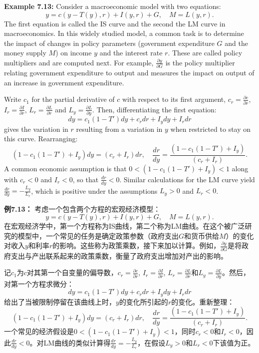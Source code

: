 \begin{original}
\textbf{Example 7.13:} Consider a macroeconomic model with two equations:
\[
y = c(y - T(y), r) + I(y, r) + G, \quad M = L(y, r).
\]
The first equation is called the IS curve and the second the LM curve in macroeconomics. In this widely studied model, a common task is to determine the impact of changes in policy parameters (government expenditure $G$ and the money supply $M$) on income $y$ and the interest rate $r$. These are called policy multipliers and are computed next. For example, $\frac{\partial y}{\partial G}$ is the policy multiplier relating government expenditure to output and measures the impact on output of an increase in government expenditure.

Write $c_1$ for the partial derivative of $c$ with respect to its first argument, $c_r = \frac{\partial c}{\partial r}$, $I_r = \frac{\partial I}{\partial r}$, $L_r = \frac{\partial L}{\partial r}$ and $L_y = \frac{\partial L}{\partial y}$. Then, differentiating the first equation:
\[
dy = c_1(1 - T')dy + c_r dr + I_y dy + I_r dr
\]
gives the variation in $r$ resulting from a variation in $y$ when restricted to stay on this curve. Rearranging:
\[
(1 - c_1(1 - T') + I_y)dy = (c_r + I_r)dr, \quad \frac{dr}{dy} = \frac{(1 - c_1(1 - T') + I_y)}{(c_r + I_r)}.
\]
A common economic assumption is that $0 < (1 - c_1(1 - T') + I_y) < 1$ along with $c_r < 0$ and $I_r < 0$, so that $\frac{dr}{dy} < 0$. Similar calculations for the LM curve yield $\frac{dr}{dy} = -\frac{L_y}{L_r}$, which is positive under the assumptions $L_y > 0$ and $L_r < 0$.
\end{original}
\begin{translation}
\textbf{例7.13：} 考虑一个包含两个方程的宏观经济模型：
\[
y = c(y - T(y), r) + I(y, r) + G, \quad M = L(y, r).
\]
在宏观经济学中，第一个方程称为IS曲线，第二个称为LM曲线。在这个被广泛研究的模型中，一个常见的任务是确定政策参数（政府支出$G$和货币供给$M$）的变化对收入$y$和利率$r$的影响。这些称为政策乘数，接下来加以计算。例如，$\frac{\partial y}{\partial G}$是将政府支出与产出联系起来的政策乘数，衡量了政府支出增加对产出的影响。

记$c_1$为$c$对其第一个自变量的偏导数，$c_r = \frac{\partial c}{\partial r}$, $I_r = \frac{\partial I}{\partial r}$, $L_r = \frac{\partial L}{\partial r}$和$L_y = \frac{\partial L}{\partial y}$。然后，对第一个方程求微分：
\[
dy = c_1(1 - T')dy + c_r dr + I_y dy + I_r dr
\]
给出了当被限制停留在该曲线上时，$y$的变化所引起的$r$的变化。重新整理：
\[
(1 - c_1(1 - T') + I_y)dy = (c_r + I_r)dr, \quad \frac{dr}{dy} = \frac{(1 - c_1(1 - T') + I_y)}{(c_r + I_r)}.
\]
一个常见的经济假设是$0 < (1 - c_1(1 - T') + I_y) < 1$，同时$c_r < 0$和$I_r < 0$，因此$\frac{dr}{dy} < 0$。对LM曲线的类似计算得$\frac{dr}{dy} = -\frac{L_y}{L_r}$，在假设$L_y > 0$和$L_r < 0$下该值为正。
\end{translation}


